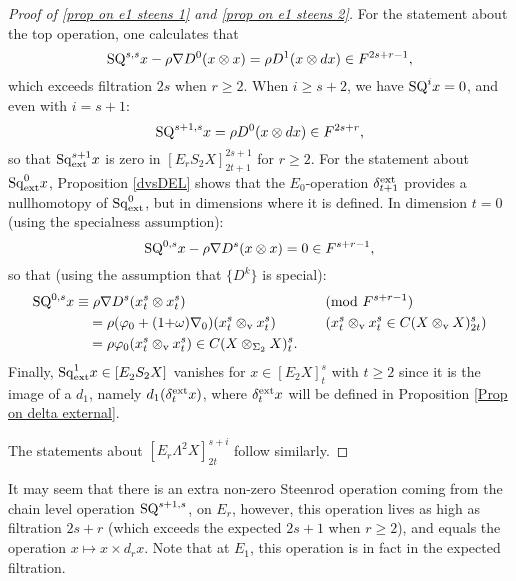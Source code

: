 \documentclass[11pt]{amsart} \renewcommand{\baselinestretch}{1.2}
\theoremstyle{plain}
\newtheorem{prop}[thm]{Proposition}
\theoremstyle{definition}
\let\oldphi\phi
\let\phi\varphi
\renewcommand{\to}{\longrightarrow}
\newcommand{\twist}{\omega}
\newcommand{\Nabla}{\nabla}
\newcommand{\Sq}{\mathrm{Sq}}
\newcommand{\Edownup}[5]{[E_{#1}^{#2}#3]^{#4}_{#5}}
\newcommand{\dver}{_\mathrm{v}}
\renewcommand{\mapsto}{\longmapsto}
\begin{document}
\begin{second quadrant homotopy sseq operations}
\begin{proof}[Proof of \ref{prop on e1 steens 1} and \ref{prop on e1 steens 2}]
For the statement about the top operation, one calculates that
\[\textup{SQ}^{s,s}x-\rho\Nabla D^0(x\otimes x)=\rho D^{1}(x\otimes dx)\in F^{2s+r-1},\] which exceeds filtration $2s$ when $r\geq2$.
When $i\geq s+2$, we have $\textup{SQ}^{i}x=0$, and even with $i=s+1$:
\[\textup{SQ}^{s+1,s}x=\rho D^{0}(x\otimes dx)\in F^{2s+r},\]
so that $\Sq^{s+1}_\textup{ext}x$ is zero in $\Edownup{r}{}{S_2X}{2s+1}{2t+1}$ for $r\geq2$.
For the statement about $\Sq_\textup{ext}^0x$, Proposition \ref{dvsDEL} shows that the $E_0$-operation $\delta_{t+1}^\textup{ext}$ provides a nullhomotopy of $\Sq_\textup{ext}^0$, but in dimensions where it is defined. In dimension $t=0$ (using the specialness assumption):
\[\textup{SQ}^{0,s}x-\rho\Nabla D^s(x\otimes x)=0 \in F^{s+r-1},\]
so that (using the assumption that $\{D^k\}$ is special):
\begin{alignat*}{2}
\textup{SQ}^{0,s}x
&\equiv
\rho\Nabla D^s(x^s_t\otimes x^s_t)&&\textup{(mod $F^{s+r-1}$)}%
\\
&\quad =
\rho(\oldphi_0+(1{+}\twist)\Nabla_0)(x^s_t\otimes\dver x^s_t)%
&\quad&\text{($x^s_t\otimes\dver x^s_t\in C(X\otimes\dver X)_{2t}^{s}$)}\\
&\quad =
\rho\oldphi_0(x^s_t\otimes\dver x^s_t)\in C(X\otimes_{\Sigma_2} X)_{t}^{s}.
\end{alignat*}
Finally, $\Sq^1_\textup{ext}x\in\Edownup{2}{}{S_2X}{}{}$ vanishes for $x\in \Edownup{2}{}{X}{s}{t}$ with $t\geq2$ since it is the image of a $d_1$, namely $d_1(\delta^\textup{ext}_tx)$, where $\delta_t^\textup{ext}x$ will be defined in Proposition \ref{Prop on delta external}.

The statements about $\Edownup{r}{}{\Lambda^2X}{s+i}{2t}$ follow similarly.
\end{proof}
It may seem that there is an extra non-zero Steenrod operation coming from the chain level operation $\textup{SQ}^{s+1,s}$, on $E_r$, however, this operation lives as high as filtration $2s+r$ (which exceeds the expected $2s+1$ when $r\geq2$), and equals the operation $x\mapsto x\times d_rx$. Note that at $E_1$, this operation is in fact in the expected filtration.


\end{second quadrant homotopy sseq operations}
\end{document}
